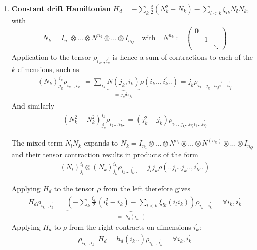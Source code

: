 \documentclass[letterpaper]{article}
\begin{document}
\begin{enumerate}
    \item \textbf{Constant drift Hamiltonian} $H_d = -\sum_k \frac{\xi}{2} \left(N_k^2 - N_k\right) - \sum_{l<k} \xi_{lk} N_lN_k$, with
      \begin{align}
      N_k = I_{n_1}\otimes \dots \otimes N^{n_k} \otimes \dots \otimes I_{n_Q} \quad \text{with} \quad N^{n_k} := \begin{pmatrix} 0 & & \\ & 1& \\ & & \ddots \end{pmatrix}
      \end{align}
      Application to the tensor $\rho_{i_k .., i_k^\prime}$ is hence a sum of contractions to each of the $k$ dimensions, such as
      \begin{align}
        \left(N_k\right)_{j_k}^{i_k} \rho_{i_k .., i_k^\prime ..} = \sum_{i_k} \underbrace{N(j_k, i_k)}_{ = j_k\delta_{j_ki_k} } \rho(i_k.., i_k^\prime ..) = j_k \rho_{i_1\dots j_k \dots i_Q i_1^\prime \dots i_Q^\prime}
      \end{align}
      And similarly
      \begin{align}
        \left(N_k^2-N_k^2\right)_{j_k}^{i_k} \rho_{i_k .., i_k^\prime ..} = \left(j_k^2 - j_k\right) \rho_{i_1\dots j_k \dots i_Q i_1^\prime \dots i_Q^\prime}
      \end{align}

      The mixed term $N_lN_k$ expands to $N_k = I_{n_1}\otimes \dots \otimes N^{n_l} \otimes \dots \otimes N^{(n_k)} \otimes \dots \otimes I_{n_Q}$ and their tensor contraction results in products of the form 
      \begin{align}
        (N_l)^{i_l}_{j_l} \otimes (N_k)_{j_k}^{i_k} \rho_{i_k .., i_k^\prime ..} = j_lj_k\rho(..j_l .. j_k.., i_k^\prime ..)
      \end{align}

      Applying $H_d$ to the tensor $\rho$ from the left therefore gives  
      \begin{align}
        H_d \rho_{i_k .., i_k^\prime ..} = \underbrace{\left(-\sum_k \frac{\xi_k}{2}(i_k^2 - i_k) - \sum_{l<k} \xi_{lk} (i_l i_k) \right)}_{=:h_d(i_k..)} \rho_{i_k .., i_k^\prime..} \quad \forall i_k, i_k^\prime
      \end{align}
      Applying $H_d$ to $\rho$ from the right contracts on dimensions $i_k^\prime$:
      \begin{align}
        \rho_{i_k .., i_k^\prime ..} H_d  = h_d(i_k^\prime..) \rho_{i_k .., i_k^\prime..} \quad \forall i_k, i_k^\prime
        \end{align}


\end{enumerate}
\end{document}

